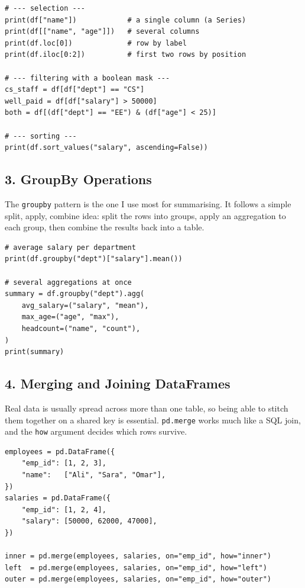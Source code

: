 \documentclass[11pt,a4paper]{article}
\begin{document}
\begin{lstlisting}[style=py, caption={Selecting, filtering, and sorting rows.}]
# --- selection ---
print(df["name"])            # a single column (a Series)
print(df[["name", "age"]])   # several columns
print(df.loc[0])             # row by label
print(df.iloc[0:2])          # first two rows by position

# --- filtering with a boolean mask ---
cs_staff = df[df["dept"] == "CS"]
well_paid = df[df["salary"] > 50000]
both = df[(df["dept"] == "EE") & (df["age"] < 25)]

# --- sorting ---
print(df.sort_values("salary", ascending=False))
\end{lstlisting}

\subsection*{3. GroupBy Operations}
The \texttt{groupby} pattern is the one I use most for summarising. It follows a simple split, apply, combine idea: split the rows into groups, apply an aggregation to each group, then combine the results back into a table.

\begin{lstlisting}[style=py, caption={Summarising with groupby.}]
# average salary per department
print(df.groupby("dept")["salary"].mean())

# several aggregations at once
summary = df.groupby("dept").agg(
    avg_salary=("salary", "mean"),
    max_age=("age", "max"),
    headcount=("name", "count"),
)
print(summary)
\end{lstlisting}

\subsection*{4. Merging and Joining DataFrames}
Real data is usually spread across more than one table, so being able to stitch them together on a shared key is essential. \texttt{pd.merge} works much like a SQL join, and the \texttt{how} argument decides which rows survive.

\begin{lstlisting}[style=py, caption={Merging two DataFrames on a shared key.}]
employees = pd.DataFrame({
    "emp_id": [1, 2, 3],
    "name":   ["Ali", "Sara", "Omar"],
})
salaries = pd.DataFrame({
    "emp_id": [1, 2, 4],
    "salary": [50000, 62000, 47000],
})

inner = pd.merge(employees, salaries, on="emp_id", how="inner")
left  = pd.merge(employees, salaries, on="emp_id", how="left")
outer = pd.merge(employees, salaries, on="emp_id", how="outer")
\end{lstlisting}
\end{document}
